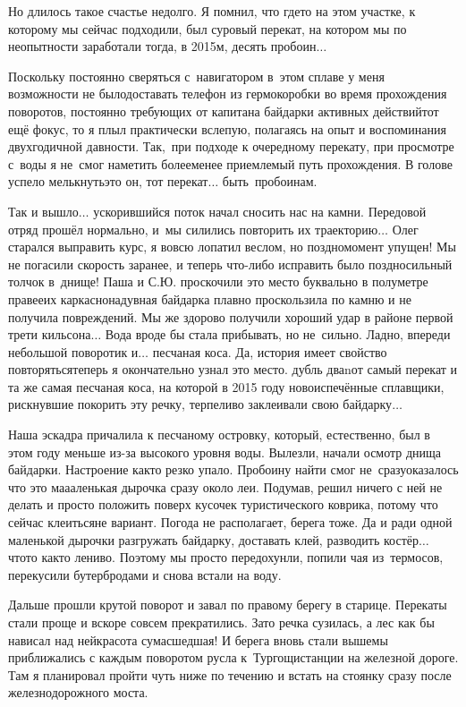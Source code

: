 Но длилось такое счастье недолго. Я помнил, что где\sdash то на этом участке, к которому мы сейчас подходили, был суровый перекат, на котором мы по неопытности заработали тогда, в 2015\sdash м, десять пробоин$\ldots$

Поскольку постоянно сверяться с~навигатором в~этом сплаве у меня возможности не было\mdash доставать телефон из гермокоробки во время прохождения поворотов, постоянно требующих от капитана байдарки активных действий\mdash тот ещё фокус, то я плыл практически вслепую, полагаясь на опыт и воспоминания двухгодичной давности. Так,~при подходе к очередному перекату, при просмотре с~воды я не~смог наметить более\sdash менее приемлемый путь прохождения. В голове успело мелькнуть\mdash это он, тот перекат$\ldots$ быть~пробоинам.

Так и вышло$\ldots$ ускорившийся поток начал сносить нас на камни. Передовой отряд прошёл нормально, и~мы силились повторить их траекторию$\ldots$ Олег старался выправить курс, я вовсю лопатил веслом, но поздно\mdash момент упущен! Мы не погасили скорость заранее, и теперь что-либо исправить было поздно\mdash сильный толчок в~днище! Паша и С.Ю. проскочили это место буквально в полуметре правее\mdash их каркасно\sdash надувная байдарка плавно проскользила по камню и не получила повреждений. Мы же здорово получили хороший удар в районе первой трети кильсона$\ldots$ Вода вроде бы стала прибывать, но не~сильно. Ладно, впереди небольшой поворотик и$\ldots$ песчаная коса. Да, история имеет свойство повторяться\mdash теперь я окончательно узнал это место. дубль два\mdash nот самый перекат и та же самая песчаная коса, на которой в 2015 году новоиспечённые сплавщики, рискнувшие покорить эту речку, терпеливо заклеивали свою байдарку$\ldots$ 

Наша эскадра причалила к песчаному островку, который, естественно, был в этом году меньше из-за высокого уровня воды. Вылезли, начали осмотр днища байдарки. Настроение как\sdash то резко упало. Пробоину найти смог не~сразу\mdash оказалось что это ма\sdash а\sdash аленькая дырочка сразу около леи. Подумав, решил ничего с ней не делать и просто положить поверх кусочек туристического коврика, потому что сейчас клеиться\mdash не вариант. Погода не располагает, берега тоже. Да и ради одной маленькой дырочки разгружать байдарку, доставать клей, разводить костёр$\ldots$ что\sdash то как\sdash то лениво. Поэтому мы просто передохунли, попили чая из~термосов, перекусили бутербродами и снова встали на воду.

Дальше прошли крутой поворот и завал по правому берегу в старице. Перекаты стали проще и вскоре совсем прекратились. Зато речка сузилась, а лес как бы нависал над ней\mdash красота сумасшедшая! И берега вновь стали выше\mdash мы приближались с каждым поворотом русла к~Тургощи\mdash станции на железной дороге. Там я планировал пройти чуть ниже по течению и встать на стоянку сразу после железнодорожного моста. 

